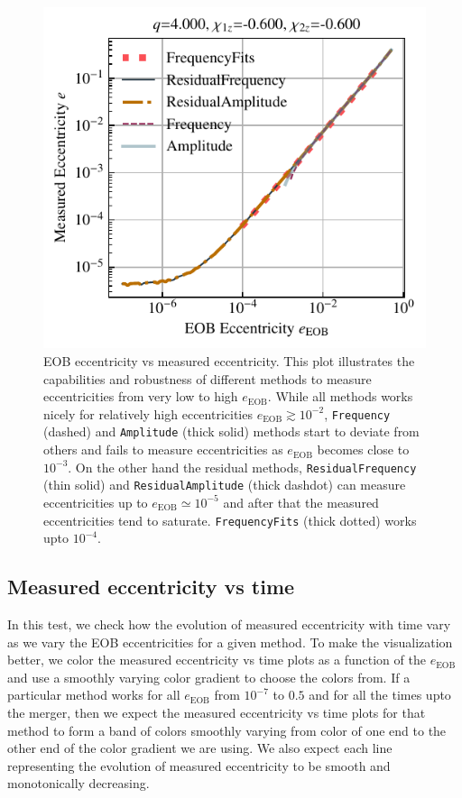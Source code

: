 \documentclass[aps,prd,amsmath,floats,floatfix, twocolumn,
superscriptaddress,nofootinbib,showpacs]{revtex4-1}
\begin{document}
\begin{figure}[thb]
\includegraphics[width=\columnwidth]{test_eob_vs_measured_ecc_example}
\caption{
  EOB eccentricity vs measured eccentricity. This plot illustrates the
  capabilities and robustness of different methods to measure
  eccentricities from very low to high $e_{\text{EOB}}$.  While all
  methods works nicely for relatively high eccentricities
  $e_{\text{EOB}} \gtrsim 10^{-2}$, \texttt{Frequency} (dashed) and
  \texttt{Amplitude} (thick solid) methods start to deviate from others
  and fails to measure eccentricities as $e_{\text{EOB}}$ becomes close
  to $10^{-3}$. On the other hand the residual methods,
  \texttt{ResidualFrequency} (thin solid) and \texttt{ResidualAmplitude}
  (thick dashdot) can measure eccentricities up to $e_{\text{EOB}}
  \simeq 10^{-5}$ and after that the measured eccentricities tend to
  saturate. \texttt{FrequencyFits} (thick dotted) works upto $10^{-4}$.
}
\label{fig:eob_vs_measured_ecc}
\end{figure}

\subsection{Measured eccentricity vs time}
\label{sec:measured-eccentricity-vs-time}
In this test, we check how the evolution of measured eccentricity with
time vary as we vary the EOB eccentricities for a given method. To
make the visualization better, we color the measured eccentricity vs
time plots as a function of the $e_{\text{EOB}}$ and use a smoothly
varying color gradient to choose the colors from. If a particular
method works for all $e_{\text{EOB}}$ from $10^{-7}$ to $0.5$ and for
all the times upto the merger, then we expect the measured
eccentricity vs time plots for that method to form a band of colors
smoothly varying from color of one end to the other end of the color
gradient we are using. We also expect each line representing the
evolution of measured eccentricity to be smooth and monotonically
decreasing.
\end{document}
